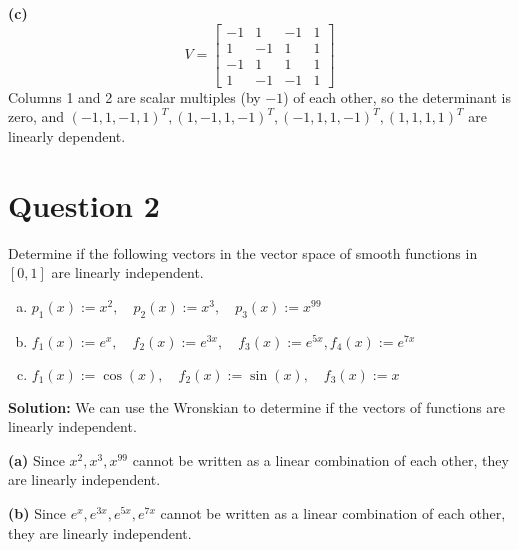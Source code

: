 \documentclass{article}
\begin{document}
\vspace{0.25cm}
\noindent\textbf{(c)}
$$ V = \begin{bmatrix} -1 & 1 & -1 & 1 \\ 1 & -1 & 1 & 1 \\ -1 & 1 & 1 & 1 \\ 1 & -1 & -1 & 1 \end{bmatrix} $$
Columns 1 and 2 are scalar multiples (by $-1$) of each other, so the determinant is zero, and $ (-1, 1, -1, 1)^T, (1, -1, 1, -1)^T, (-1, 1, 1, -1)^T, (1, 1, 1, 1)^T $ are linearly dependent.

\newpage
\section*{Question 2}
Determine if the following vectors in the vector space of smooth functions in $[0, 1]$ are linearly independent.
\begin{enumerate}[(a)]
    \item $p_1(x) := x^2, \quad p_2(x) := x^3, \quad p_3(x) := x^{99}$
    \item $f_1(x) := e^x, \quad f_2(x) := e^{3x}, \quad f_3(x) := e^{5x}, f_4(x) := e^{7x}$
    \item $f_1(x) := \cos(x), \quad f_2(x) := \sin(x), \quad f_3(x) := x$
\end{enumerate}

\noindent\textbf{Solution:}
We can use the Wronskian to determine if the vectors of functions are linearly independent.

\vspace{0.25cm}
\noindent\textbf{(a)}
Since $x^2, x^3, x^{99}$ cannot be written as a linear combination of each other, they are linearly independent.

\vspace{0.25cm}
\noindent\textbf{(b)}
Since $e^x, e^{3x}, e^{5x}, e^{7x}$ cannot be written as a linear combination of each other, they are linearly independent.
\end{document}

